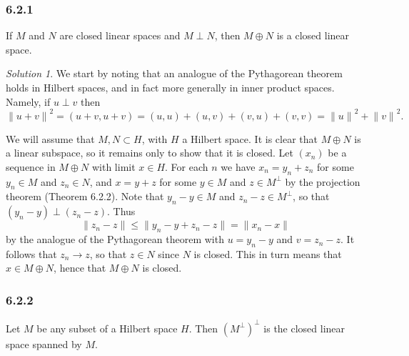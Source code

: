 \documentclass{report}
\newcommand{\norm}[1]{{\lVert #1 \rVert}}
\theoremstyle{remark}
\newtheorem*{solution}{Solution}
\begin{document}
\subsubsection*{6.2.1}
If $M$ and $N$ are closed linear spaces and $M \perp N$, then $M \oplus N$ is a closed linear space.

\begin{solution}
  We start by noting that an analogue of the Pythagorean theorem holds in Hilbert spaces, and in fact more generally in inner product spaces. Namely, if $u \perp v$ then
  \begin{equation*}
    \norm{u+v}^2 = (u+v,u+v) = (u,u) + (u,v) + (v,u) + (v,v) = \norm{u}^2 + \norm{v}^2.
  \end{equation*}

  We will assume that $M, N \subset H$, with $H$ a Hilbert space. It is clear that $M \oplus N$ is a linear subspace, so it remains only to show that it is closed. Let $(x_n)$ be a sequence in $M \oplus N$ with limit $x \in H$. For each $n$ we have $x_n = y_n + z_n$ for some $y_n \in M$ and $z_n \in N$, and $x = y + z$ for some $y \in M$ and $z \in M^\perp$ by the projection theorem (Theorem 6.2.2). Note that $y_n - y \in M$ and $z_n - z \in M^\perp$, so that $(y_n - y) \perp (z_n - z)$. Thus
  \begin{equation*}
    \norm{z_n - z} \le \norm{y_n - y + z_n - z} = \norm{x_n - x}
  \end{equation*}
  by the analogue of the Pythagorean theorem with $u = y_n - y$ and $v = z_n - z$. It follows that $z_n \to z$, so that $z \in N$ since $N$ is closed. This in turn means that $x \in M \oplus N$, hence that $M \oplus N$ is closed.
\end{solution}

\subsubsection*{6.2.2}
Let $M$ be any subset of a Hilbert space $H$. Then $(M^\perp)^\perp$ is the closed linear space spanned by $M$.
\end{document}
